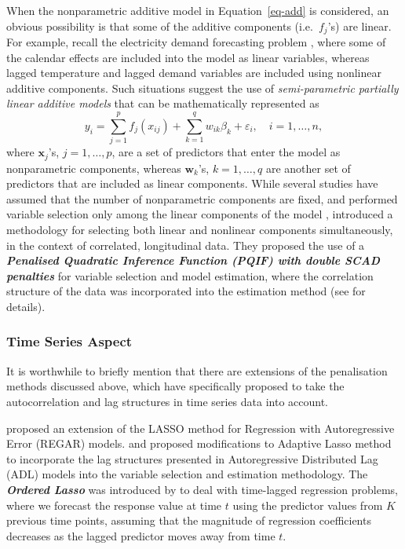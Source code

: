 \documentclass[
  11pt,
  a4paper,
]{article}
\begin{document}
When the nonparametric additive model in Equation~\ref{eq-add} is
considered, an obvious possibility is that some of the additive
components (i.e.~\(f_{j}\)'s) are linear. For example, recall the
electricity demand forecasting problem \autocite{HF2010,FH2012}, where
some of the calendar effects are included into the model as linear
variables, whereas lagged temperature and lagged demand variables are
included using nonlinear additive components. Such situations suggest
the use of \emph{semi-parametric partially linear additive models} that
can be mathematically represented as \[
 y_{i} = \sum_{j=1}^{p} {f_{j}(x_{ij})} + \sum_{k=1}^{q} {w_{ik}\beta_{k}} + \varepsilon_{i}, \quad i = 1, \dots, n,
\] where \(\bm{x}_{j}\)'s, \(j = 1, \dots, p\), are a set of predictors
that enter the model as nonparametric components, whereas
\(\bm{w}_{k}\)'s, \(k = 1, \dots, q\) are another set of predictors that
are included as linear components. While several studies have assumed
that the number of nonparametric components are fixed, and performed
variable selection only among the linear components of the model
\autocite{Lian2012,Guo2013,Liu2011}, \textcite{Wang2014} introduced a
methodology for selecting both linear and nonlinear components
simultaneously, in the context of correlated, longitudinal data. They
proposed the use of a \textbf{\emph{Penalised Quadratic Inference
Function (PQIF) with double SCAD penalties}} for variable selection and
model estimation, where the correlation structure of the data was
incorporated into the estimation method (see \textcite{Wang2014} for
details).

\subsubsection{Time Series Aspect}\label{time-series-aspect}

It is worthwhile to briefly mention that there are extensions of the
penalisation methods discussed above, which have specifically proposed
to take the autocorrelation and lag structures in time series data into
account.

\textcite{Wang2007} proposed an extension of the LASSO method for
Regression with Autoregressive Error (REGAR) models. \textcite{Park2013}
and \textcite{Konzen2016} proposed modifications to Adaptive Lasso
method to incorporate the lag structures presented in Autoregressive
Distributed Lag (ADL) models into the variable selection and estimation
methodology. The \textbf{\emph{Ordered Lasso}} was introduced by
\textcite{Tibshirani2016} to deal with time-lagged regression problems,
where we forecast the response value at time \(t\) using the predictor
values from \(K\) previous time points, assuming that the magnitude of
regression coefficients decreases as the lagged predictor moves away
from time \(t\).
\end{document}
